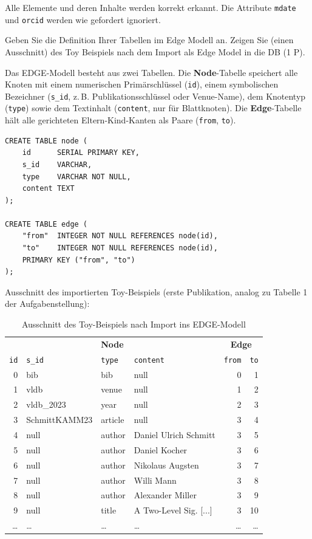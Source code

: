 \documentclass[11pt]{scrartcl}
\begin{document}
Alle Elemente und deren Inhalte werden korrekt erkannt. Die Attribute \texttt{mdate} und \texttt{orcid}
werden wie gefordert ignoriert.

Geben Sie die Definition Ihrer Tabellen im Edge Modell an. Zeigen Sie (einen Ausschnitt) des Toy Beispiels nach dem Import als Edge Model in die DB (1 P).

Das EDGE-Modell besteht aus zwei Tabellen. Die \textbf{Node}-Tabelle speichert alle Knoten mit einem
numerischen Primärschlüssel (\texttt{id}), einem symbolischen Bezeichner (\texttt{s\_id}, z.\,B.
Publikationsschlüssel oder Venue-Name), dem Knotentyp (\texttt{type}) sowie dem Textinhalt
(\texttt{content}, nur für Blattknoten). Die \textbf{Edge}-Tabelle hält alle gerichteten Eltern-Kind-Kanten
als Paare (\texttt{from}, \texttt{to}).

\begin{lstlisting}[style=dmrsql, frame=single]
CREATE TABLE node (
    id      SERIAL PRIMARY KEY,
    s_id    VARCHAR,
    type    VARCHAR NOT NULL,
    content TEXT
);

CREATE TABLE edge (
    "from"  INTEGER NOT NULL REFERENCES node(id),
    "to"    INTEGER NOT NULL REFERENCES node(id),
    PRIMARY KEY ("from", "to")
);
\end{lstlisting}

Ausschnitt des importierten Toy-Beispiels (erste Publikation, analog zu Tabelle 1 der Aufgabenstellung):

\begin{table}[H]
\centering
\begin{tabular}{r l l l | r r}
\toprule
\multicolumn{4}{c|}{\textbf{Node}} & \multicolumn{2}{c}{\textbf{Edge}} \\
\texttt{id} & \texttt{s\_id} & \texttt{type} & \texttt{content} & \texttt{from} & \texttt{to} \\
\midrule
0 & bib            & bib          & null                  & 0 & 1 \\
1 & vldb           & venue        & null                  & 1 & 2 \\
2 & vldb\_2023     & year         & null                  & 2 & 3 \\
3 & SchmittKAMM23  & article      & null                  & 3 & 4 \\
4 & null           & author       & Daniel Ulrich Schmitt & 3 & 5 \\
5 & null           & author       & Daniel Kocher         & 3 & 6 \\
6 & null           & author       & Nikolaus Augsten      & 3 & 7 \\
7 & null           & author       & Willi Mann            & 3 & 8 \\
8 & null           & author       & Alexander Miller      & 3 & 9 \\
9 & null           & title        & A Two-Level Sig. [...] & 3 & 10 \\
\ldots & \ldots & \ldots & \ldots & \ldots & \ldots \\
\bottomrule
\end{tabular}
\caption{Ausschnitt des Toy-Beispiels nach Import ins EDGE-Modell}
\end{table}
\end{document}
